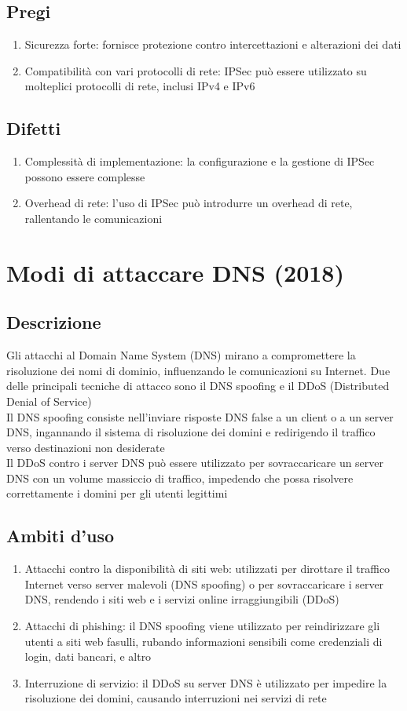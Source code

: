 \documentclass[10pt,oneside,a4paper]{article}
\begin{document}
\subsection{Pregi}
\begin{enumerate}
\item Sicurezza forte: fornisce protezione contro intercettazioni e alterazioni dei dati
\item Compatibilità con vari protocolli di rete: IPSec può essere utilizzato su molteplici protocolli di rete, inclusi IPv4 e IPv6
\end{enumerate}
\subsection{Difetti}
\begin{enumerate}
\item Complessità di implementazione: la configurazione e la gestione di IPSec possono essere complesse
\item Overhead di rete: l'uso di IPSec può introdurre un overhead di rete, rallentando le comunicazioni
\end{enumerate}
\section{Modi di attaccare DNS (2018)}
\subsection{Descrizione}
Gli attacchi al Domain Name System (DNS) mirano a compromettere la risoluzione dei nomi di dominio, influenzando le comunicazioni su Internet. Due delle principali tecniche di attacco sono il DNS spoofing e il DDoS (Distributed Denial of Service)\\
Il DNS spoofing consiste nell'inviare risposte DNS false a un client o a un server DNS, ingannando il sistema di risoluzione dei domini e redirigendo il traffico verso destinazioni non desiderate\\
Il DDoS contro i server DNS può essere utilizzato per sovraccaricare un server DNS con un volume massiccio di traffico, impedendo che possa risolvere correttamente i domini per gli utenti legittimi
\subsection{Ambiti d'uso}
\begin{enumerate}
\item Attacchi contro la disponibilità di siti web: utilizzati per dirottare il traffico Internet verso server malevoli (DNS spoofing) o per sovraccaricare i server DNS, rendendo i siti web e i servizi online irraggiungibili (DDoS)
\item Attacchi di phishing: il DNS spoofing viene utilizzato per reindirizzare gli utenti a siti web fasulli, rubando informazioni sensibili come credenziali di login, dati bancari, e altro
\item Interruzione di servizio: il DDoS su server DNS è utilizzato per impedire la risoluzione dei domini, causando interruzioni nei servizi di rete
\end{enumerate}
\end{document}

